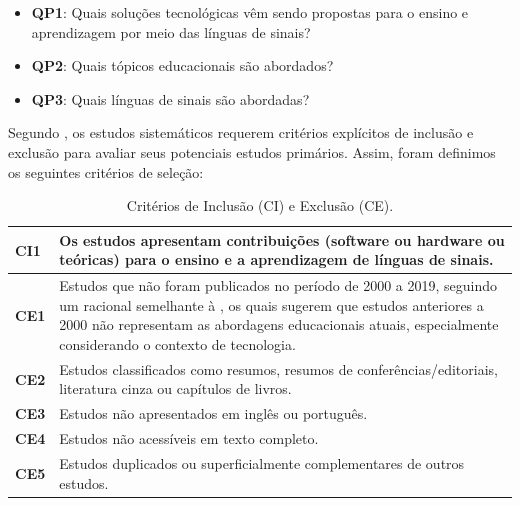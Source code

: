 \begin{itemize}
    \setlength\itemsep{0em}
    \item \textbf{QP1}: Quais soluções tecnológicas vêm sendo propostas para o ensino e aprendizagem por meio das línguas de sinais?
    \item \textbf{QP2}: Quais tópicos educacionais são abordados?
    \item \textbf{QP3}: Quais línguas de sinais são abordadas?
\end{itemize}

Segundo , os estudos sistemáticos requerem critérios explícitos de inclusão e exclusão para avaliar seus potenciais estudos primários. Assim, foram definimos os seguintes critérios de seleção:

\begin{table}[htbp]
\caption{Critérios de Inclusão (CI) e Exclusão (CE).}
\label{tab:ms:criterios-selecao}
\centering
\begin{tabularx}{\textwidth}{C{1cm}|X} \hline
\textbf{CI1} & Os estudos apresentam contribuições (software ou hardware ou teóricas) para o ensino e a aprendizagem de línguas de sinais. \\ \hline
\textbf{CE1} & Estudos que não foram publicados no período de 2000 a 2019, seguindo um racional semelhante à , os quais sugerem que estudos anteriores a 2000 não representam as abordagens educacionais atuais, especialmente considerando o contexto de tecnologia. \\ \hline
\textbf{CE2} & Estudos classificados como resumos, resumos de conferências/editoriais, literatura cinza ou capítulos de livros. \\ \hline
\textbf{CE3} & Estudos não apresentados em inglês ou português. \\ \hline
\textbf{CE4} & Estudos não acessíveis em texto completo. \\ \hline
\textbf{CE5} & Estudos duplicados ou superficialmente complementares de outros estudos. \\ \hline
\end{tabularx}
\end{table}

